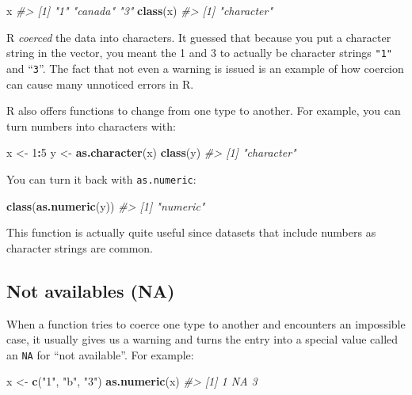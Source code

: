 \documentclass[
]{krantz}
\newenvironment{Shaded}{\begin{snugshade}}{\end{snugshade}}
\newcommand{\CommentTok}[1]{\textcolor[rgb]{0.37,0.37,0.37}{\textit{#1}}}
\newcommand{\DecValTok}[1]{\textcolor[rgb]{0.06,0.06,0.06}{#1}}
\newcommand{\KeywordTok}[1]{\textcolor[rgb]{0.27,0.27,0.27}{\textbf{#1}}}
\newcommand{\NormalTok}[1]{#1}
\newcommand{\OperatorTok}[1]{\textcolor[rgb]{0.43,0.43,0.43}{\textbf{#1}}}
\newcommand{\StringTok}[1]{\textcolor[rgb]{0.5,0.5,0.5}{#1}}
\begin{document}
\begin{Shaded}
\begin{Highlighting}[]
\NormalTok{x}
\CommentTok{#> [1] "1"      "canada" "3"}
\KeywordTok{class}\NormalTok{(x)}
\CommentTok{#> [1] "character"}
\end{Highlighting}
\end{Shaded}

R \emph{coerced} the data into characters. It guessed that because you put a character string in the vector, you meant the 1 and 3 to actually be character strings \texttt{"1"} and ``\texttt{3}''. The fact that not even a warning is issued is an example of how coercion can cause many unnoticed errors in R.

R also offers functions to change from one type to another. For example, you can turn numbers into characters with:

\begin{Shaded}
\begin{Highlighting}[]
\NormalTok{x <-}\StringTok{ }\DecValTok{1}\OperatorTok{:}\DecValTok{5}
\NormalTok{y <-}\StringTok{ }\KeywordTok{as.character}\NormalTok{(x)}
\KeywordTok{class}\NormalTok{(y)}
\CommentTok{#> [1] "character"}
\end{Highlighting}
\end{Shaded}

You can turn it back with \texttt{as.numeric}:

\begin{Shaded}
\begin{Highlighting}[]
\KeywordTok{class}\NormalTok{(}\KeywordTok{as.numeric}\NormalTok{(y))}
\CommentTok{#> [1] "numeric"}
\end{Highlighting}
\end{Shaded}

This function is actually quite useful since datasets that include numbers as character strings are common.

\hypertarget{not-availables-na}{%
\subsection{Not availables (NA)}\label{not-availables-na}}

When a function tries to coerce one type to another and encounters an impossible case, it usually gives us a warning and turns the entry into a special value called an \texttt{NA} for ``not available''. For example:

\begin{Shaded}
\begin{Highlighting}[]
\NormalTok{x <-}\StringTok{ }\KeywordTok{c}\NormalTok{(}\StringTok{"1"}\NormalTok{, }\StringTok{"b"}\NormalTok{, }\StringTok{"3"}\NormalTok{)}
\KeywordTok{as.numeric}\NormalTok{(x)}
\CommentTok{#> [1]  1 NA  3}
\end{Highlighting}
\end{Shaded}
\end{document}
